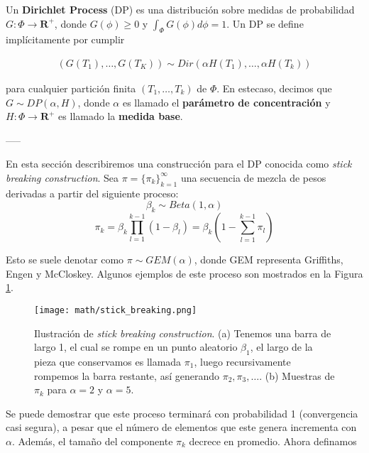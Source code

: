 \documentclass[letterpaper,12pt,oneside]{book} %
\begin{document}
Un \textbf{Dirichlet Process} (DP) es una distribución sobre medidas de probabilidad $G: \Phi \rightarrow \mathbf{R}^{+}$, donde $G(\phi)\geq 0$ y $\int_{\Phi}G(\phi)d\phi=1$. Un DP se define implícitamente por cumplir 

\begin{align}
    (G(T_{1}), \ldots, G(T_{K})) \sim Dir(\alpha H(T_{1}), \ldots, \alpha H(T_{k}))
\end{align}

para cualquier partición finita $(T_{1}, \ldots, T_{k})$ de $\Phi$. En estecaso, decimos que $G\sim DP(\alpha, H)$, donde $\alpha$ es llamado el \textbf{parámetro de concentración} y $H: \Phi \rightarrow \mathbf{R}^{+}$ es llamado la \textbf{medida base}.

-----



En esta sección describiremos una construcción para el DP conocida como \textit{stick breaking construction}. Sea $\pi=\{\pi_{k}\}_{k=1}^{\infty}$ una secuencia de mezcla de pesos derivadas a partir del siguiente proceso:
\begin{equation}
    \beta_{k}\sim Beta(1, \alpha)
\end{equation}
\begin{equation}
    \pi_{k} = \beta_{k}\prod_{l=1}^{k-1}(1-\beta_{l}) = \beta_{k}(1-\sum_{l=1}^{k-1}\pi_{l})
\end{equation}

Esto se suele denotar como $\pi \sim GEM(\alpha)$, donde GEM representa Griffiths, Engen y McCloskey. Algunos ejemplos de este proceso son mostrados en la Figura \ref{img:stick_breaking}.

\begin{figure}
    \centering
    \texttt{[image: math/stick\_breaking.png]}
    \caption{Ilustración de \textit{stick breaking construction}. (a) Tenemos una barra de largo 1, el cual se rompe en un punto aleatorio $\beta_{1}$, el largo de la pieza que conservamos es llamada $\pi_{1}$, luego recursivamente rompemos la barra restante, así generando $\pi_{2}, \pi_{3}, \ldots$. (b) Muestras de $\pi_{k}$ para $\alpha=2$ y $\alpha=5$.}
    \label{img:stick_breaking}
\end{figure}

Se puede demostrar que este proceso terminará con probabilidad 1 (convergencia casi segura), a pesar que el número de elementos que este genera incrementa con $\alpha$. Además, el tamaño del componente $\pi_{k}$ decrece en promedio.
Ahora definamos
\end{document}
